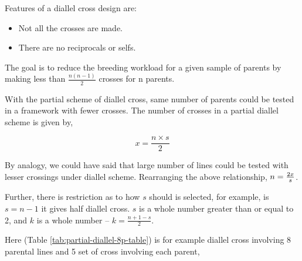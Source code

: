 \documentclass[
  answers,addpoints,12pt]{exam}
\begin{document}
Features of a diallel cross design are:

\begin{itemize}
\item Not all the crosses are made.
\item There are no reciprocals or selfs.
\end{itemize}

The goal is to reduce the breeding workload for a given sample of parents by making less than \(\frac{n(n-1)}{2}\) crosses for n parents.

With the partial scheme of diallel cross, same number of parents could be tested in a framework with fewer crosses. The number of crosses in a partial diallel scheme is given by,

\[
x = \frac{n \times s}{2}
\]

By analogy, we could have said that large number of lines could be tested with lesser crossings under diallel scheme. Rearranging the above relationship, \(\large n = \frac{2x}{s}\).

Further, there is restriction as to how \(s\) should is selected, for example, is \(s = n -1\) it gives half diallel cross. \(s\) is a whole number greater than or equal to 2, and \(k\) is a whole number -- \(k = \frac{n + 1 - s}{2}\).

Here (Table \ref{tab:partial-diallel-8p-table}) is for example diallel cross involving 8 parental lines and 5 set of cross involving each parent,

\begingroup\fontsize{8}{10}\selectfont
\end{document}
